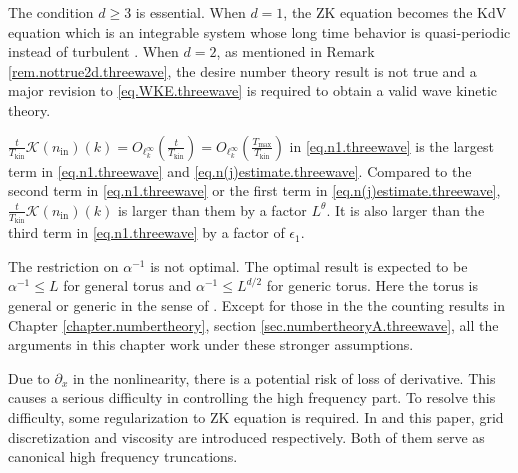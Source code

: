 \begin{rem}
The condition $d\ge 3$ is essential. When $d=1$, the ZK equation becomes the KdV equation which is an integrable system whose long time behavior is quasi-periodic instead of turbulent \cite{jin2021cancellations}. When $d=2$, as mentioned in Remark \ref{rem.nottrue2d.threewave}, the desire number theory result is not true and a major revision to \eqref{eq.WKE.threewave} is required to obtain a valid wave kinetic theory.
\end{rem}

\begin{rem}
$\frac{t}{T_{\mathrm{kin}}}\mathcal K(n_{\mathrm{in}})(k)=O_{\ell^\infty_k}\left(\frac{t}{T_{\mathrm{kin}}}\right)=O_{\ell^\infty_k}\left(\frac{T_{\mathrm{max}}}{T_{\mathrm{kin}}}\right)$ in \eqref{eq.n1.threewave} is the largest term in \eqref{eq.n1.threewave} and \eqref{eq.n(j)estimate.threewave}. Compared to the second term in \eqref{eq.n1.threewave} or the first term in \eqref{eq.n(j)estimate.threewave}, $\frac{t}{T_{\mathrm{kin}}}\mathcal K(n_{\mathrm{in}})(k)$ is larger than them by a factor $L^{\theta}$.  It is also larger than the third term in \eqref{eq.n1.threewave} by a factor of $\epsilon_1$.
\end{rem}

\begin{rem}
The restriction on $\alpha^{-1}$ is not optimal. The optimal result is expected to be $\alpha^{-1}\le L$ for general torus and $\alpha^{-1}\le L^{d/2}$ for generic torus. Here the torus is general or generic in the sense of \cite{deng2021derivation}. Except for those in the the counting results in Chapter \ref{chapter.numbertheory}, section \ref{sec.numbertheoryA.threewave}, all the arguments in this chapter work under these stronger assumptions.
\end{rem}

\begin{rem}
Due to $\partial_x$ in the nonlinearity, there is a potential risk of loss of derivative. This causes a serious difficulty in controlling the high frequency part. To resolve this difficulty, some regularization to ZK equation is required. In \cite{staffilani2021wave} and this paper, grid discretization and viscosity are introduced respectively. Both of them serve as canonical high frequency truncations.
\end{rem}




 





